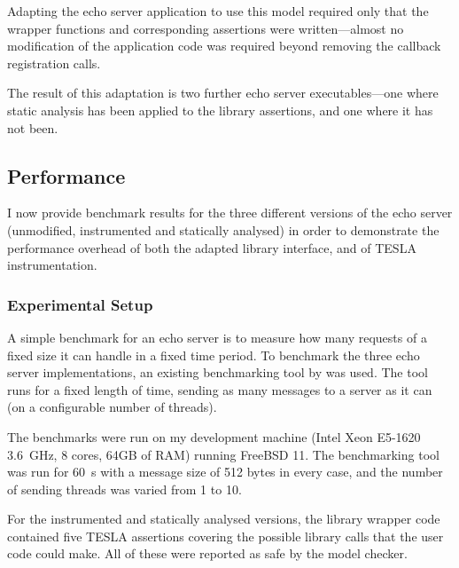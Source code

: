 Adapting the echo server application to use this model required only that the
wrapper functions and corresponding assertions were written---almost no
modification of the application code was required beyond removing the callback
registration calls.

The result of this adaptation is two further echo server executables---one where
static analysis has been applied to the library assertions, and one where it has
not been.

\subsection{Performance}

I now provide benchmark results for the three different versions of the echo
server (unmodified, instrumented and statically analysed) in order to
demonstrate the performance overhead of both the adapted library interface, and
of TESLA instrumentation.

\subsubsection{Experimental Setup}

A simple benchmark for an echo server is to measure how many requests of a fixed
size it can handle in a fixed time period. To benchmark the three echo server
implementations, an existing benchmarking tool by \textcite{hoyer_rust_2016} was
used. The tool runs for a fixed length of time, sending as many messages to a
server as it can (on a configurable number of threads).

The benchmarks were run on my development machine (Intel Xeon E5-1620
\SI{3.6}{\GHz}, 8 cores, 64GB of RAM) running FreeBSD 11. The benchmarking tool
was run for \SI{60}{\s} with a message size of 512 bytes in every case, and the
number of sending threads was varied from 1 to 10.

For the instrumented and statically analysed versions, the library wrapper code
contained five TESLA assertions covering the possible library calls that the
user code could make. All of these were reported as safe by the model checker.


